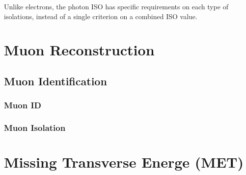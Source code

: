 \vspace{0.3cm}
Unlike electrons, the photon ISO has specific requirements on each type of isolations, instead of a single criterion on a combined ISO value.

\section{Muon Reconstruction}\label{sec:muonrecon}

\subsection{Muon Identification}
\subsubsection{Muon ID}
\subsubsection{Muon Isolation}
\section{Missing Transverse Energe (MET)}
